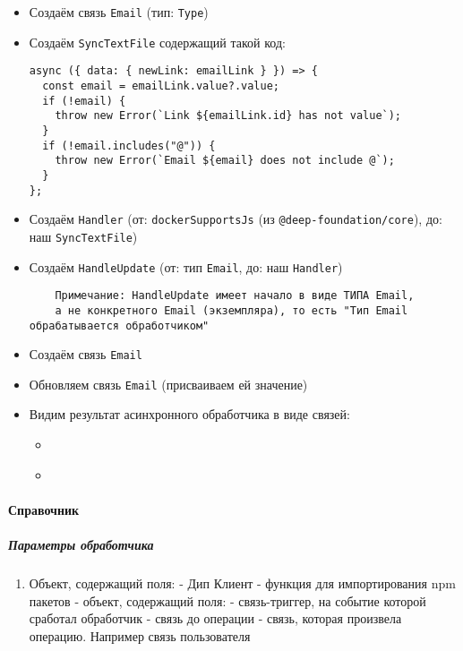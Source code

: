 \documentclass{article}
\begin{document}
\begin{itemize}
  \item Создаём связь \texttt{Email} (тип: \texttt{Type})
  \item Создаём \texttt{SyncTextFile} содержащий такой код:
        \begin{lstlisting}
async ({ data: { newLink: emailLink } }) => {
  const email = emailLink.value?.value;
  if (!email) {
    throw new Error(`Link ${emailLink.id} has not value`);
  }
  if (!email.includes("@")) {
    throw new Error(`Email ${email} does not include @`);
  }
};
\end{lstlisting}
  \item Создаём \texttt{Handler} (от: \texttt{dockerSupportsJs} (из
        \texttt{@deep-foundation/core}), до: наш \texttt{SyncTextFile})
  \item Создаём \texttt{HandleUpdate} (от: тип \texttt{Email}, до: наш
        \texttt{Handler})
        \begin{verbatim}
    Примечание: HandleUpdate имеет начало в виде ТИПА Email,
    а не конкретного Email (экземпляра), то есть "Тип Email обрабатывается обработчиком"
    \end{verbatim}
  \item Создаём связь \texttt{Email}
  \item Обновляем связь \texttt{Email} (присваиваем ей значение)
  \item Видим результат асинхронного обработчика в виде связей:
        \begin{itemize}
          \item \begin{handler_success_result_info}
          \end{handler_success_result_info}\\
          
          \item \begin{handler_fail_result_info}
          \end{handler_fail_result_info}\\
        \end{itemize}
\end{itemize}

\paragraph{Справочник}
\subparagraph{Параметры обработчика}
\begin{enumerate}
  \item Объект, содержащий поля:
         - Дип Клиент
         - функция для импортирования npm пакетов
         - объект, содержащий поля:
         - связь-триггер, на событие которой сработал
        обработчик
         - связь до операции
         - связь, которая произвела операцию.
        Например связь пользователя
\end{enumerate}
\end{document}
